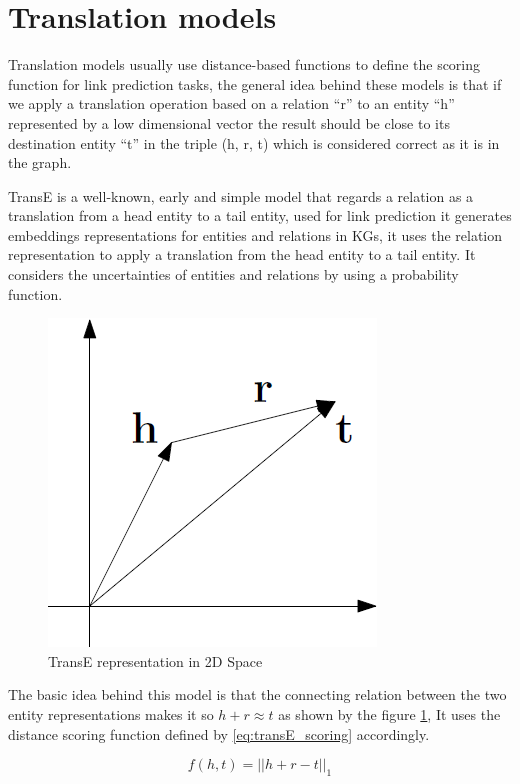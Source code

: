 \section{Translation models}\label{sec:emb-translations}


Translation models usually use distance-based functions to define the scoring function for link prediction tasks, the general idea behind these models is that if we apply a translation operation based on a relation ``r'' to an entity ``h'' represented by a low dimensional vector the result should be close to its destination entity ``t'' in the triple (h, r, t) which is considered correct as it is in the graph.

TransE \cite{} is a well-known, early and simple model that regards a relation as a translation from a head entity to a tail entity, used for link prediction it generates embeddings representations for entities and relations in KGs, it uses the relation representation to apply a translation from the head entity to a tail entity. It considers the uncertainties of entities and relations by using a probability function. 

\begin{figure}[!htp]
    \centering
    \includegraphics[width=.4\textwidth]{fig/embeddings/TransE.png}
    \caption{TransE representation in 2D Space}
    \label{fig:emb-transE}
\end{figure}

The basic idea behind this model is that the connecting relation between the two entity representations makes it so  $h + r \approx t$ as shown by the figure \ref{fig:emb-transE}, It uses the distance scoring function defined by \ref{eq:transE_scoring} accordingly.

\begin{equation}
    \label{eq:transE_scoring}
    f (h, t) = ||h + r - t||_1
\end{equation}
    
